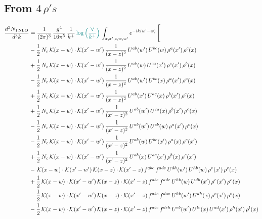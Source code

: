 \documentclass[9pt]{article}
\numberwithin{equation}{section}
\begin{document}
\subsection{From $4\, \rho's$}
\begin{align}
\frac{d^{3}N_{1\,\mathrm{NLO}}}{d^{3}k} & = \frac{1}{(2\pi)^{3}}\,\frac{g^{4}}{16\pi^{5}}\,\frac{1}{k^{+}}\,{\color{teal}\log{\left(\frac{\vee}{k^{+}}\right)}}\,\int_{x,x',z,w,w'}e^{-ik(w'-w)}\,\Bigg[\notag\\ & -\frac{1}{2}\,N_{c}\,\mathcal{K}(x-w)\cdot\mathcal{K}(x'-w')\,\frac{1}{(x-z)^{2}}\,U^{ab}(w')\,U^{bc}(w)\,\rho^{a}(x')\,\rho^{c}(x)\notag\\
& +\frac{1}{2}\,N_{c}\,\mathcal{K}(x-w)\cdot\mathcal{K}(x'-w')\,\frac{1}{(x-z)^{2}}\,U^{ab}(w)\,U^{ca}(x')\,\rho^{c}(x')\,\rho^{b}(x)\notag\\
& -\frac{1}{2}\,N_{c}\,\mathcal{K}(x-w)\cdot\mathcal{K}(x'-w')\,\frac{1}{(x-z)^{2}}\,U^{ab}(w')\,U^{bc}(x)\,\rho^{a}(x')\,\rho^{c}(x)\notag\\
& +\frac{1}{2}\,N_{c}\,\mathcal{K}(x-w)\cdot\mathcal{K}(x'-w')\,\frac{1}{(x-z)^{2}}\,U^{ab}(x')\,U^{ac}(x)\,\rho^{b}(x')\,\rho^{c}(x)\notag\\
& +\frac{1}{2}\,N_{c}\,\mathcal{K}(x-w)\cdot\mathcal{K}(x'-w')\,\frac{1}{(x'-z)^{2}}\,U^{ab}(w')\,U^{ca}(x)\,\rho^{b}(x')\,\rho^{c}(x)\notag\\
& -\frac{1}{2}\,N_{c}\,\mathcal{K}(x-w)\cdot\mathcal{K}(x'-w')\,\frac{1}{(x'-z)^{2}}\,U^{ab}(w')\,U^{cb}(w)\,\rho^{a}(x')\,\rho^{c}(x)\notag\\
& -\frac{1}{2}\,N_{c}\,\mathcal{K}(x-w)\cdot\mathcal{K}(x'-w')\,\frac{1}{(x'-z)^{2}}\,U^{ab}(w)\,U^{bc}(x')\,\rho^{a}(x)\,\rho^{c}(x')\notag\\
& +\frac{1}{2}\,N_{c}\,\mathcal{K}(x-w)\cdot\mathcal{K}(x'-w')\,\frac{1}{(x'-z)^{2}}\,U^{ab}(x)\,U^{ac}(x')\,\rho^{b}(x)\,\rho^{c}(x')\notag\\
& -\,\mathcal{K}(x-w)\cdot\mathcal{K}(x'-w')\,\mathcal{K}(x-z)\cdot\mathcal{K}(x'-z)\,f^{abc}\,f^{ade}\,U^{dh}(w')\,U^{hb}(w)\,\rho^{e}(x')\,\rho^{c}(x)\notag\\
& +\frac{1}{2}\,\mathcal{K}(x-w)\cdot\mathcal{K}(x'-w')\,\mathcal{K}(x-z)\cdot\mathcal{K}(x'-z)\,f^{abc}\,f^{ade}\,U^{hb}(w)\,U^{dh}(x')\,\rho^{e}(x')\,\rho^{c}(x)\notag\\
& -\frac{1}{2}\,\mathcal{K}(x-w)\cdot\mathcal{K}(x'-w')\,\mathcal{K}(x-z)\cdot\mathcal{K}(x'-z)\,f^{abc}\,f^{dae}\,U^{hb}(w')\,U^{dh}(x)\,\rho^{c}(x')\,\rho^{e}(x)\notag\\
& -\frac{1}{2}\,\mathcal{K}(x-w)\cdot\mathcal{K}(x'-w')\,\mathcal{K}(x-z)\cdot\mathcal{K}(x'-z)\,f^{abc}\,f^{deh}\,U^{eb}(w')\,U^{lc}(x)\,U^{ad}(x')\,\rho^{h}(x')\,\rho^{l}(x)\notag\\

\end{align}
\end{document}
